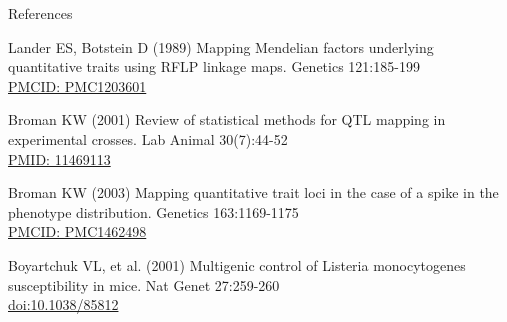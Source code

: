 \documentclass[aspectratio=169,12pt,t]{beamer}
\begin{document}
\begin{frame}{References}
\vspace{-7mm}

  \bbi

\item Lander ES, Botstein D (1989) Mapping Mendelian factors
  underlying quantitative traits using RFLP linkage maps. Genetics
  121:185-199 \\
  \href{https://www.ncbi.nlm.nih.gov/pmc/articles/PMC1203601}{\footnotesize
    PMCID: PMC1203601}

\item Broman KW (2001) Review of statistical methods for QTL mapping
  in experimental crosses. Lab Animal 30(7):44-52 \\
  \href{https://www.ncbi.nlm.nih.gov/pubmed/11469113}{\footnotesize
    PMID: 11469113}

\item Broman KW (2003) Mapping quantitative trait loci in the case
  of a spike in the phenotype distribution. Genetics 163:1169-1175 \\
  \href{https://www.ncbi.nlm.nih.gov/pmc/articles/PMC1462498}{\footnotesize
    PMCID: PMC1462498}

\item Boyartchuk VL, et al. (2001) Multigenic control of Listeria monocytogenes
  susceptibility in mice. Nat Genet 27:259-260 \\
  \href{https://doi.org/10.1038/85812}{\footnotesize doi:10.1038/85812}

\ei


\end{frame}
\end{document}
